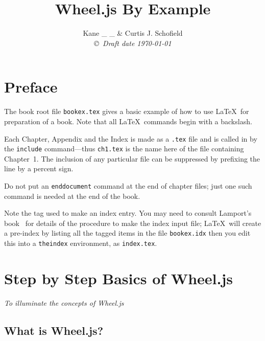 \documentclass[16pt]{book}
\title{Wheel.js By Example  }
\author{Kane _ _ \& Curtis J. Schofield \\
{\small\em \copyright \  Draft date \today }}
\begin{document}
\tableofcontents
\chapter*{Preface}\normalsize
\pagestyle{plain}
The book root file {\tt bookex.tex} gives a basic example of how to
use \LaTeX \ for preparation of a book. Note that all
\LaTeX \ commands begin with a
backslash.

Each
Chapter, Appendix and the Index is made as a {\tt *.tex} file and is
called in by the {\tt include} command---thus {\tt ch1.tex} is
the name here of the file containing Chapter~1. The inclusion of any
particular file can be suppressed by prefixing the line by a
percent sign.


 Do not put an {\tt end{document}} command at the end of chapter files;
just one such command is needed at the end of the book.

Note the tag used to make an index entry. You may need to consult Lamport's
book~\cite{lamport} for details of the procedure to make the index input
file; \LaTeX \ will create a pre-index by listing all the tagged
items in the file {\tt bookex.idx} then you edit this into
a {\tt theindex} environment, as {\tt index.tex}.





\pagestyle{headings}

%
%





\chapter{Step by Step Basics of Wheel.js}
\begin{center}
{\small\em To illuminate the concepts of Wheel.js}
\end{center}


\section{What is Wheel.js?} %
\label{sec:What is Wheel.js?}
\end{document}
